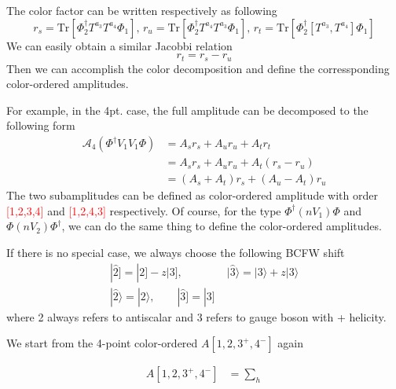 \documentclass[12pt]{article}
\newcommand{\aket}[1]{|#1\rangle}
\newcommand{\sket}[1]{|#1]}
\begin{document}
    The color factor can be written respectively as following
    \begin{equation*}
        r_s=\mathrm{Tr}[\Phi_2^\dagger T^{a_3}T^{a_4}\Phi_1],\,r_u=\mathrm{Tr}[\Phi_2^\dagger T^{a_4}T^{a_3}\Phi_1],\,
        r_t=\mathrm{Tr}[\Phi_2^\dagger [T^{a_3},T^{a_4}]\Phi_1]
    \end{equation*}
    We can easily obtain a similar Jacobbi relation
    \begin{equation*}
        r_t=r_s-r_u
    \end{equation*}
    Then we can accomplish the color decomposition and define the corressponding color-ordered amplitudes.

    For example, in the 4pt. case, the full amplitude can be decomposed to the following form
        \begin{align*}
            \mathcal{A}_4(\Phi^\dagger V_1V_1\Phi)&=A_s r_s+A_u r_u+A_t r_t\\
            &=A_s r_s+A_u r_u+A_t(r_s-r_u)\\
            &=(A_s+A_t)r_s+(A_u-A_t)r_u
        \end{align*}
        The two subamplitudes can be defined as color-ordered amplitude with order \textcolor{red}{[1,2,3,4]} and 
        \textcolor{red}{[1,2,4,3]} respectively.
        Of course, for the type $\Phi^\dagger(nV_1)\Phi$ and $\Phi (nV_2) \Phi^\dagger$, we can do the same thing to define the color-ordered amplitudes.
    
    If there is no special case, we always choose the following BCFW shift
        \begin{gather*}
            \sket{\hat{2}}=\sket{2}-z\sket{3},\qquad \qquad \aket{\hat{3}}=\aket{3}+z\aket{3}\\
            \aket{\hat{2}}=\aket{2}, \qquad \sket{\hat{3}}=\sket{3}
        \end{gather*}
    where 2 always refers to antiscalar and 3 refers to gauge boson with + helicity.

    We start from the 4-point color-ordered $A[1,2,3^+,4^-]$ again
    \begin{center}
    \begin{minipage}{0.45\textwidth}
        \begin{align*}
        A[1,2,3^+,4^-] &= \sum_{h}
        \end{align*}
        \end{minipage}
        \hspace{-3em}
        \begin{minipage}{0.45\textwidth}
        \end{minipage}
    \end{center}
\end{document}
